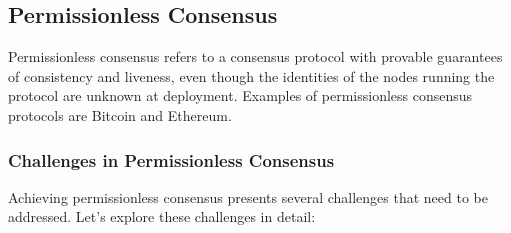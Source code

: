 \subsection{Permissionless Consensus}
Permissionless consensus refers to a consensus protocol with provable guarantees of consistency and liveness, even though the identities of the nodes running the protocol are unknown at deployment. Examples of permissionless consensus protocols are Bitcoin and Ethereum.

\subsubsection{Challenges in Permissionless Consensus}
Achieving permissionless consensus presents several challenges that need to be addressed. Let's explore these challenges in detail:

